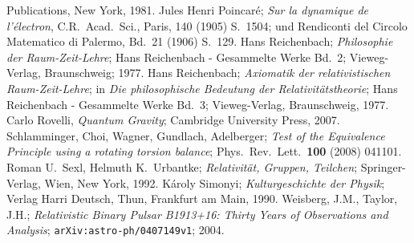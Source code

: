 \begin{thebibliography}{99}
      Publications, New York, 1981.      
 Jules Henri Poincar\'e; {\it Sur la dynamique de 
     l'\'electron}, C.R.\ Acad.\ Sci., Paris, 140 (1905) S.~1504; und 
      Rendiconti del Circolo Matematico di Palermo, Bd.~21 (1906) S.~129.
 Hans Reichenbach; {\em Philosophie der 
       Raum-Zeit-Lehre}; Hans Reichenbach - Gesammelte Werke Bd.\ 2;
       Vieweg-Verlag, Braunschweig; 1977.
 Hans Reichenbach; {\em Axiomatik der
       relativistischen Raum-Zeit-Lehre}; in {\em Die philosophische
       Bedeutung der Relativit\"atstheorie}; Hans Reichenbach - Gesammelte
       Werke Bd.\ 3; Vieweg-Verlag, Braunschweig, 1977. 
 Carlo Rovelli, \textit{Quantum Gravity}; Cambridge
      University Press, 2007.       
 Schlamminger, Choi, Wagner, Gundlach,
         Adelberger; {\em Test of the Equivalence Principle using a
         rotating torsion balance}; Phys.\ Rev.\ Lett.\ {\bf 100} (2008)
         041101.     
 Roman U.\ Sexl, Helmuth K.\ Urbantke; {\it Relativit\"at,
      Gruppen, Teilchen}; Springer-Verlag, Wien, New York, 1992.
      K\'aroly Simonyi; {\it Kulturgeschichte der Physik}; Verlag
       Harri Deutsch, Thun, Frankfurt am Main, 1990.
 Weisberg, J.M., Taylor, J.H.; {\em Relativistic Binary Pulsar
          B1913+16: Thirty Years of Observations and Analysis}; 
          \verb+arXiv:astro-ph/0407149v1+; 2004. 

\end{thebibliography}


%